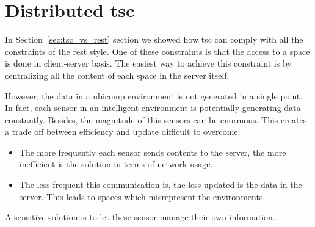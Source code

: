\section{Distributed \ac{tsc}}
\label{sec:distributed_tsc}

In Section~\ref{sec:tsc_vs_rest} section we showed how \ac{tsc} can comply with all the constraints of the \ac{rest} style.
One of these constraints is that the access to a space is done in client-server basis.
The easiest way to achieve this constraint is by centralizing all the content of each space in the server itself.


However, the data in a \ac{ubicomp} environment is not generated in a single point.
In fact, each sensor in an intelligent environment is potentially generating data constantly.
Besides, the magnitude of this sensors can be enormous.
This creates a trade off between efficiency and update difficult to overcome:
\begin{itemize}
  \item The more frequently each sensor sends contents to the server, the more inefficient is the solution in terms of network usage.
  \item The less frequent this communication is, the less updated is the data in the server.
        This leads to spaces which misrepresent the environments.
\end{itemize}
A sensitive solution is to let these sensor manage their own information.


